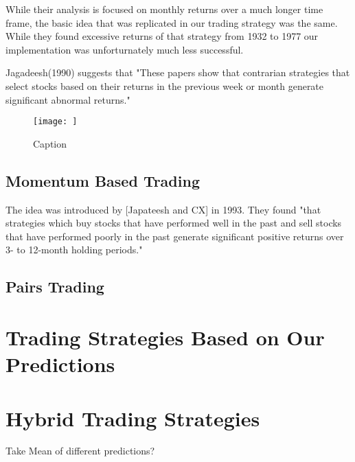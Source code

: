 While their analysis is focused on monthly returns over a much longer time frame, the basic idea that was replicated in our trading strategy was the same. While they found excessive returns of that strategy from 1932 to 1977 our implementation was unforturnately much less successful.

Jagadeesh(1990) suggests that "These papers show that contrarian 
strategies that select stocks based on their returns in the previous week or month generate significant abnormal returns."




\begin{figure}
    \centering
    \texttt{[image: ]}
    \caption{Caption}
    \label{fig:my_label}
\end{figure}{}


\subsection{Momentum Based Trading}
The idea was introduced by [Japateesh and CX] in 1993. They found "that strategies which buy stocks that have performed well in the past and sell stocks that have performed poorly in the past generate significant positive returns over 3- to 12-month holding periods." 


\subsection{Pairs Trading}



\section{Trading Strategies Based on Our Predictions}



\section{Hybrid Trading Strategies}
Take Mean of different predictions?


